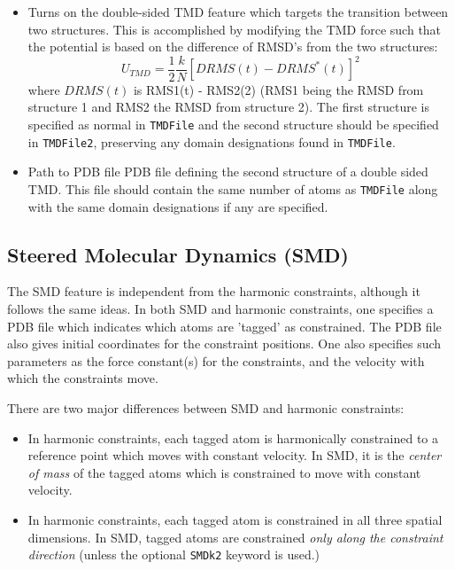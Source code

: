 \begin{itemize}
\item
{}
{Turns on the double-sided TMD feature which targets the transition between two structures. 
This is accomplished by modifying the TMD force such that the potential is based on the
difference of RMSD's from the two structures:
\begin{equation}
U_{TMD} = \frac{1}{2} \frac{k}{N} \left[ DRMS(t) - DRMS^*(t) \right]^2
\label{eq:dstmdpotential}
\end{equation}
where $DRMS(t)$ is RMS1(t) - RMS2(2) (RMS1 being the RMSD from structure 1 and RMS2 the RMSD from structure 2).
The first structure is specified as normal in {\tt TMDFile} and the second structure should
be specified in {\tt TMDFile2}, preserving any domain designations found in {\tt TMDFile}. 
}

\item
{}
{Path to PDB file}
{PDB file defining the second structure of a double sided TMD. This file
should contain the same number of atoms as {\tt TMDFile} along with the 
same domain designations if any are specified.
}

\end{itemize}

\subsection{Steered Molecular Dynamics (SMD)}

The SMD feature is independent from the harmonic constraints, although it
follows the same ideas.  In both SMD and harmonic constraints, one specifies
a PDB file which indicates which atoms are 'tagged' as constrained.  The PDB
file also gives initial coordinates for the constraint positions.  One also
specifies such parameters as the force constant(s) for the constraints, 
and the velocity with which the constraints move.  

There are two major differences between SMD and
harmonic constraints:
\begin{itemize}
\item In harmonic constraints, each tagged atom is harmonically constrained
  to a reference point which moves with constant velocity.  In SMD, it is
  the {\em center of mass} of the tagged atoms which is constrained to move
  with constant velocity.

\item In harmonic constraints, each tagged atom is constrained in all three
  spatial dimensions.  In SMD, tagged atoms are constrained {\em only along
  the constraint direction} (unless the optional {\tt SMDk2} keyword is used.)
\end{itemize}

